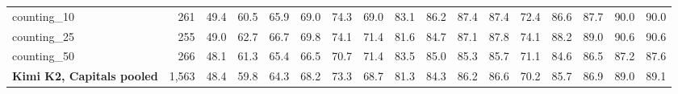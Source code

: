 \begin{table}[h]
\begin{tabular}{l r r r r r r r r r r r r r r r r}
counting\_10 & 261 & 49.4 & 60.5 & 65.9 & 69.0 & 74.3 & 69.0 & 83.1 & 86.2 & 87.4 & 87.4 & 72.4 & 86.6 & 87.7 & 90.0 & 90.0 \\
counting\_25 & 255 & 49.0 & 62.7 & 66.7 & 69.8 & 74.1 & 71.4 & 81.6 & 84.7 & 87.1 & 87.8 & 74.1 & 88.2 & 89.0 & 90.6 & 90.6 \\
counting\_50 & 266 & 48.1 & 61.3 & 65.4 & 66.5 & 70.7 & 71.4 & 83.5 & 85.0 & 85.3 & 85.7 & 71.1 & 84.6 & 86.5 & 87.2 & 87.6 \\
\addlinespace[2pt]
\textbf{Kimi K2, Capitals pooled} & 1,563 & 48.4 & 59.8 & 64.3 & 68.2 & 73.3 & 68.7 & 81.3 & 84.3 & 86.2 & 86.6 & 70.2 & 85.7 & 86.9 & 89.0 & 89.1 \\
\bottomrule
\end{tabular}
\end{table}
